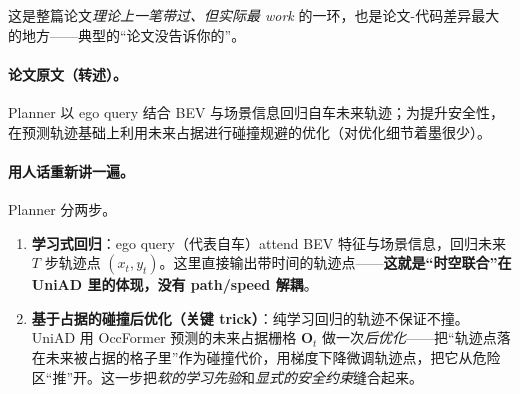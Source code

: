 这是整篇论文\emph{理论上一笔带过、但实际最 work} 的一环，也是论文-代码差异最大的地方——典型的“论文没告诉你的”。

\paragraph{论文原文（转述）。}
Planner 以 ego query 结合 BEV 与场景信息回归自车未来轨迹；为提升安全性，在预测轨迹基础上利用未来占据进行碰撞规避的优化（对优化细节着墨很少）\cite{hu2023uniad}。

\paragraph{用人话重新讲一遍。}Planner 分两步。
\begin{enumerate}
  \item \textbf{学习式回归}：ego query（代表自车）attend BEV 特征与场景信息，回归未来 $T$ 步轨迹点 $(x_t,y_t)$。这里直接输出带时间的轨迹点——\textbf{这就是“时空联合”在 UniAD 里的体现，没有 path/speed 解耦}。
  \item \textbf{基于占据的碰撞后优化（关键 trick）}：纯学习回归的轨迹不保证不撞。UniAD 用 OccFormer 预测的未来占据栅格 $\mathbf{O}_t$ 做一次\emph{后优化}——把“轨迹点落在未来被占据的格子里”作为碰撞代价，用梯度下降微调轨迹点，把它从危险区“推”开。这一步把\emph{软的学习先验}和\emph{显式的安全约束}缝合起来。
\end{enumerate}



